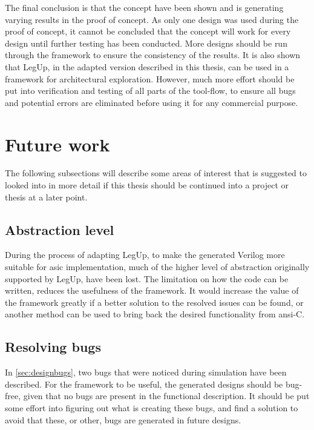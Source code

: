 The final conclusion is that the concept have been shown and is generating varying results in the proof of concept. As only one design was used during the proof of concept, it cannot be concluded that the concept will work for every design until further testing has been conducted. More designs should be run through the framework to ensure the consistency of the results. It is also shown that LegUp, in the adapted version described in this thesis, can be used in a framework for architectural exploration. However, much more effort should be put into verification and testing of all parts of the tool-flow, to ensure all bugs and potential errors are eliminated before using it for any commercial purpose.
\section{Future work}
\label{sec:futurework} 
The following subsections will describe some areas of interest that is suggested to looked into in more detail if this thesis should be continued into a project or thesis at a later point.
\subsection{Abstraction level}
During the process of adapting LegUp, to make the generated Verilog more suitable for \gls{asic} implementation, much of the higher level of abstraction originally supported by LegUp, have been lost. The limitation on how the code can be written, reduces the usefulness of the framework. It would increase the value of the framework greatly if a better solution to the resolved issues can be found, or another method can be used to bring back the desired functionality from \gls{ansi}-C.

\subsection{Resolving bugs}
In \cref{sec:designbugs}, two bugs that were noticed during simulation have been described. For the framework to be useful, the generated designs should be bug-free, given that no bugs are present in the functional description. It should be put some effort into figuring out what is creating these bugs, and find a solution to avoid that these, or other, bugs are generated in future designs.

